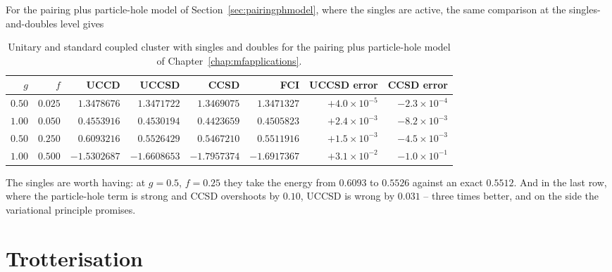 For the pairing plus particle-hole model of
Section~\ref{sec:pairingphmodel}, where the singles are active, the same
comparison at the singles-and-doubles level gives

\begin{table}[h]
\centering
\renewcommand{\arraystretch}{1.25}
\setlength{\tabcolsep}{6pt}
\small
\begin{tabular}{rrrrrrrr}
\toprule
$g$ & $f$ & UCCD & UCCSD & CCSD & FCI & UCCSD error & CCSD error\\
\midrule
$0.50$ & $0.025$ & $1.3478676$ & $1.3471722$ & $1.3469075$ & $1.3471327$
  & $+4.0\times10^{-5}$ & $-2.3\times10^{-4}$\\
$1.00$ & $0.050$ & $0.4553916$ & $0.4530194$ & $0.4423659$ & $0.4505823$
  & $+2.4\times10^{-3}$ & $-8.2\times10^{-3}$\\
$0.50$ & $0.250$ & $0.6093216$ & $0.5526429$ & $0.5467210$ & $0.5511916$
  & $+1.5\times10^{-3}$ & $-4.5\times10^{-3}$\\
$1.00$ & $0.500$ & $-1.5302687$ & $-1.6608653$ & $-1.7957374$ & $-1.6917367$
  & $+3.1\times10^{-2}$ & $-1.0\times10^{-1}$\\
\bottomrule
\end{tabular}
\caption{Unitary and standard coupled cluster with singles and doubles for
the pairing plus particle-hole model of Chapter~\ref{chap:mfapplications}.}
\label{tab:uccsd}
\end{table}

The singles are worth having: at $g=0.5$, $f=0.25$ they take the energy from
$0.6093$ to $0.5526$ against an exact $0.5512$.  And in the last row, where
the particle-hole term is strong and CCSD overshoots by $0.10$, UCCSD is
wrong by $0.031$ -- three times better, and on the side the variational
principle promises.

\section{Trotterisation}
\label{sec:ucctrotter}

